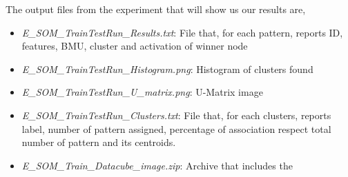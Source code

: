 \documentclass[11pt,fleqn]{book} %
\begin{document}
																																																																																																																																																																																																																						        The output files from the experiment that will show us our results are, 
																																																																																																																																																																																																																							    \begin{itemize}
																																																																																																																																																																																																																							        	\item \emph{E\_SOM\_Train\/Test\/Run\_Results.txt}: File that, for each pattern, 
																																																																																																																																																																																																																									reports ID, features, BMU, cluster and activation of winner node
																																																																																																																																																																																																																											\item \emph{E\_SOM\_Train\/Test\/Run\_Histogram.png}: Histogram of clusters found 
																																																																																																																																																																																																																											        \item \emph{E\_SOM\_Train\/Test\/Run\_U\_matrix.png}: U-Matrix image 
																																																																																																																																																																																																																												        \item \emph{E\_SOM\_Train\/Test\/Run\_Clusters.txt}: File that, for each clusters, reports label, number of pattern assigned, percentage of association respect total number of pattern and its centroids. 
																																																																																																																																																																																																																													        \item \emph{E\_SOM\_Train\_Datacube\_image.zip}: Archive that includes the 

\end{itemize}
\end{document}
